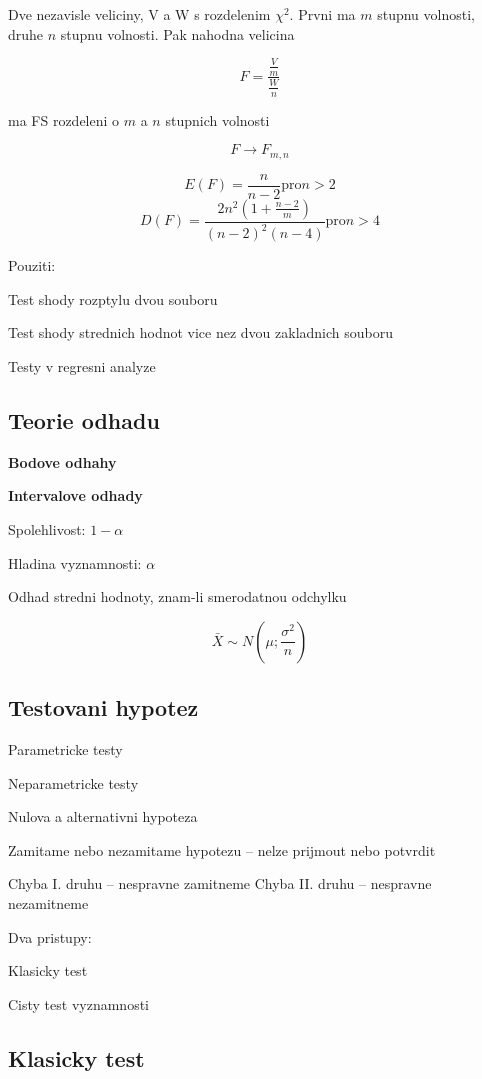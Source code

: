 \documentclass{article}
\begin{document}
Dve nezavisle veliciny, V a W s rozdelenim $\chi^2$. Prvni ma $m$ stupnu volnosti,
druhe $n$ stupnu volnosti. Pak nahodna velicina

\[ F = \frac {\frac{V}{m}} {\frac{W}{n}} \]

ma FS rozdeleni o $m$ a $n$ stupnich volnosti

\[ F \rightarrow F_{m,n} \]

\[ E(F) = \frac n {n-2} \text{pro} n>2 \]
\[ D(F) = \frac {2n^2 (1 + \frac {n-2}{m})} {(n-2)^2 (n-4)} \text{pro} n>4 \]

Pouziti:

Test shody rozptylu dvou souboru

Test shody strednich hodnot vice nez dvou zakladnich souboru

Testy v regresni analyze

\subsection{Teorie odhadu}

\textbf{Bodove odhahy}

\textbf{Intervalove odhady}

Spolehlivost: $1 - \alpha$

Hladina vyznamnosti: $\alpha$

Odhad stredni hodnoty, znam-li smerodatnou odchylku

\[ \bar{X} \sim N\left( \mu; \frac{\sigma^2}{n} \right) \]

\subsection{Testovani hypotez}

Parametricke testy

Neparametricke testy

Nulova a alternativni hypoteza

Zamitame nebo nezamitame hypotezu -- nelze prijmout nebo potvrdit

Chyba I. druhu -- nespravne zamitneme
Chyba II. druhu -- nespravne nezamitneme

Dva pristupy:

Klasicky test

Cisty test vyznamnosti

\subsection{Klasicky test}
\end{document}
